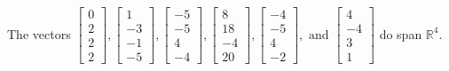 \begin{exercise}
\begin{exerciseStatement}
  \end{exerciseStatement}
  \begin{exerciseAnswer}
   The vectors \(\left[\begin{array}{r}
0 \\
2 \\
2 \\
2
\end{array}\right] , \left[\begin{array}{r}
1 \\
-3 \\
-1 \\
-5
\end{array}\right] , \left[\begin{array}{r}
-5 \\
-5 \\
4 \\
-4
\end{array}\right] , \left[\begin{array}{r}
8 \\
18 \\
-4 \\
20
\end{array}\right] , \left[\begin{array}{r}
-4 \\
-5 \\
4 \\
-2
\end{array}\right] , \text{ and } \left[\begin{array}{r}
4 \\
-4 \\
3 \\
1
\end{array}\right]\) 
  	 do  
	span \(\mathbb{R}^4\).
  


  \end{exerciseAnswer}
\end{exercise}